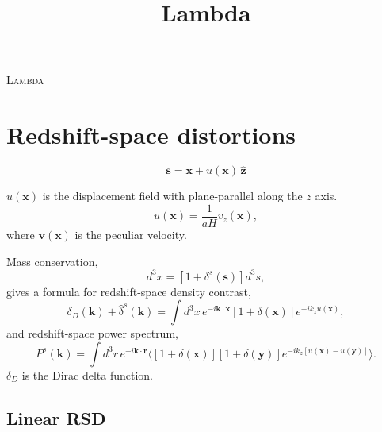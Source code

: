 \documentclass[a4paper,11pt, fleqn]{article}
\title{Lambda}
\author{}
\date{}
\begin{document}
%
%
\vspace{0.3 \paperheight}

\begin{center}
  {\Huge \textsc{Lambda}}
\end{center}

\tableofcontents

\sectionfont{\sffamily\Huge\color{Green}\selectfont}
\subsectionfont{\sffamily\color{Green}\selectfont}
\subsubsectionfont{\sffamily\color{Green}\selectfont}
\paragraphfont{\sffamily\color{Green}\selectfont}

%
%
\newpage

\section{Redshift-space distortions}
%
\begin{equation}
  \bm{s} = \bm{x} + u(\bm{x}) \, \hat{\bm{z}}
\end{equation}

$u(\bm{x})$ is the displacement field with plane-parallel along the $z$ axis.
\begin{equation}
  u(\bm{x}) = \frac{1}{aH} v_z(\bm{x}),
\end{equation}
where $\bm{v}(\bm{x})$ is the peculiar velocity.

\vspace{5mm}

Mass conservation,
%
\begin{equation}
  [1 + \delta(\bm{x})] d^3 x = [1 + \delta^s(\bm{s})] d^3 s,
\end{equation}
%
gives a formula for redshift-space density contrast,
%
\begin{equation}
  \label{eq:delta-s}
  \delta_D(\bm{k}) + \hat{\delta}^s(\bm{k})
  = \int \! d^3 x \, e^{-i\bm{k}\cdot\bm{x}} [1 + \delta(\bm{x})]
    e^{-ik_z u(\bm{x})},
\end{equation}
%
and redshift-space power spectrum,
%
\begin{equation}
  P^s(\bm{k}) = \int \! d^3 r \, e^{-i\bm{k}\cdot\bm{r}}
  \Big\langle
      [1 + \delta(\bm{x})][1 + \delta(\bm{y})]
      e^{-ik_z [u(\bm{x}) - u(\bm{y})]}\Big\rangle.
\end{equation}
$\delta_D$ is the Dirac delta function.


\newpage
\subsection{Linear RSD}
\end{document}
